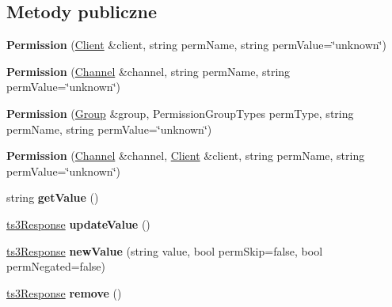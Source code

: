 \subsection*{Metody publiczne}
\begin{DoxyCompactItemize}
\item 
{\bfseries Permission} (\hyperlink{class_ts3_api_1_1_client}{Client} \&client, string perm\+Name, string perm\+Value=\char`\"{}unknown\char`\"{})\hypertarget{class_ts3_api_1_1_permission_a23776714b17d9ee0f797d753d2f2fd7c}{}\label{class_ts3_api_1_1_permission_a23776714b17d9ee0f797d753d2f2fd7c}

\item 
{\bfseries Permission} (\hyperlink{class_ts3_api_1_1_channel}{Channel} \&channel, string perm\+Name, string perm\+Value=\char`\"{}unknown\char`\"{})\hypertarget{class_ts3_api_1_1_permission_a5d5631490a405de685e2808b07804634}{}\label{class_ts3_api_1_1_permission_a5d5631490a405de685e2808b07804634}

\item 
{\bfseries Permission} (\hyperlink{class_ts3_api_1_1_group}{Group} \&group, Permission\+Group\+Types perm\+Type, string perm\+Name, string perm\+Value=\char`\"{}unknown\char`\"{})\hypertarget{class_ts3_api_1_1_permission_aca1a5d43dbaed5958de510891b3c222d}{}\label{class_ts3_api_1_1_permission_aca1a5d43dbaed5958de510891b3c222d}

\item 
{\bfseries Permission} (\hyperlink{class_ts3_api_1_1_channel}{Channel} \&channel, \hyperlink{class_ts3_api_1_1_client}{Client} \&client, string perm\+Name, string perm\+Value=\char`\"{}unknown\char`\"{})\hypertarget{class_ts3_api_1_1_permission_a1ef81bfe7b4b293129150c76a675efe6}{}\label{class_ts3_api_1_1_permission_a1ef81bfe7b4b293129150c76a675efe6}

\item 
string {\bfseries get\+Value} ()\hypertarget{class_ts3_api_1_1_permission_a10dfa432a057a22ef4f2564f4246fcad}{}\label{class_ts3_api_1_1_permission_a10dfa432a057a22ef4f2564f4246fcad}

\item 
\hyperlink{struct_ts3_api_1_1ts3_response}{ts3\+Response} {\bfseries update\+Value} ()\hypertarget{class_ts3_api_1_1_permission_a7c3bc67c4c4e8dfe5426b7ff3f7df91a}{}\label{class_ts3_api_1_1_permission_a7c3bc67c4c4e8dfe5426b7ff3f7df91a}

\item 
\hyperlink{struct_ts3_api_1_1ts3_response}{ts3\+Response} {\bfseries new\+Value} (string value, bool perm\+Skip=false, bool perm\+Negated=false)\hypertarget{class_ts3_api_1_1_permission_a8ad645707969516438deb0db0132024e}{}\label{class_ts3_api_1_1_permission_a8ad645707969516438deb0db0132024e}

\item 
\hyperlink{struct_ts3_api_1_1ts3_response}{ts3\+Response} {\bfseries remove} ()\hypertarget{class_ts3_api_1_1_permission_a0afab6f74c467118a231955909012fc2}{}\label{class_ts3_api_1_1_permission_a0afab6f74c467118a231955909012fc2}

\end{DoxyCompactItemize}
